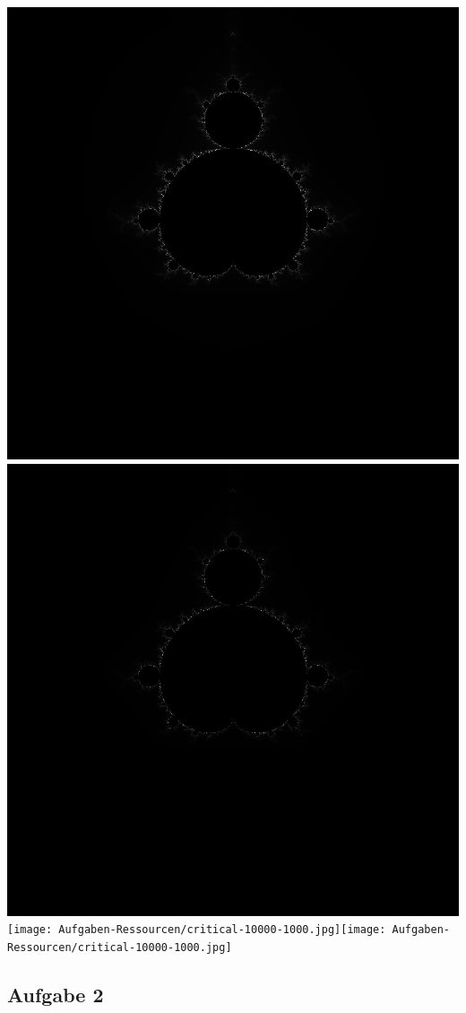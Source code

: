 \documentclass{report}
\begin{document}
	\begin{center}
		\includegraphics[width=0.4\linewidth]{Aufgaben-Ressourcen/critical-1000.jpg}\quad\includegraphics[width=0.4\linewidth]{Aufgaben-Ressourcen/critical-1000-1000.jpg}
		\\[\baselineskip]
		\texttt{[image: Aufgaben-Ressourcen/critical-10000-1000.jpg]}\quad\texttt{[image: Aufgaben-Ressourcen/critical-10000-1000.jpg]}
	\end{center}


    \subsection{Aufgabe 2}
\end{document}
